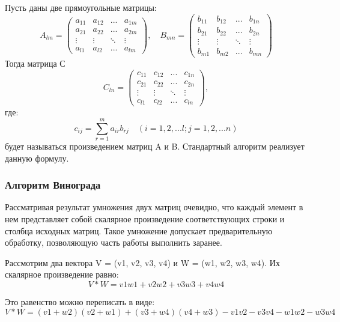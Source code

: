 \documentclass[a4paper,12pt]{article}
\begin{document}
Пусть даны две прямоугольные матрицы:
$$A_{lm} = 
\begin{pmatrix}
	a_{11} & a_{12} & ... & a_{1m}\\
	a_{21} & a_{22} & ... & a_{2m}\\
	\vdots & \vdots & \ddots & \vdots\\
	a_{l1} & a_{l2} & ... & a_{lm}
\end{pmatrix},\quad  
B_{mn} = 
\begin{pmatrix}
	b_{11} & b_{12} & ... & b_{1n}\\
	b_{21} & b_{22} & ... & b_{2n}\\
	\vdots & \vdots & \ddots & \vdots\\
	b_{m1} & b_{m2} & ... & b_{mn}
\end{pmatrix}
$$
Тогда матрица С 
$$C_{ln} = 
\begin{pmatrix}
	c_{11} & c_{12} & ... & c_{1n}\\
	c_{21} & c_{22} & ... & c_{2n}\\
	\vdots & \vdots & \ddots & \vdots\\
	c_{l1} & c_{l2} & ... & c_{ln}
\end{pmatrix},
$$
где:
\begin{equation}
\label{eq:M}
c_{ij} = 
 \sum_{r=1}^{m} a_{ir}b_{rj} \quad (i = 1,2,...l; j = 1,2,...n)
\end{equation}
будет называться произведением матриц A и B.
Стандартный алгоритм реализует данную формулу.

\subsubsection{Алгоритм Винограда}
Рассматривая результат умножения двух матриц очевидно, что каждый элемент в нем представляет собой скалярное произведение соответствующих строки и столбца исходных матриц. Такое умножение допускает предварительную обработку, позволяющую часть работы выполнить заранее.

Рассмотрим два вектора V = (v1, v2, v3, v4) и W = (w1, w2, w3, w4). Их скалярное произведение равно: \begin{equation}V * W = v1w1 + v2w2 + v3w3 + v4w4
\end{equation}

Это равенство можно переписать в виде: \begin{equation}V * W = (v1 + w2)(v2 + w1) + (v3 + w4)(v4 + w3) - v1v2 - v3v4 - w1w2 - w3w4
\end{equation}
\end{document}
